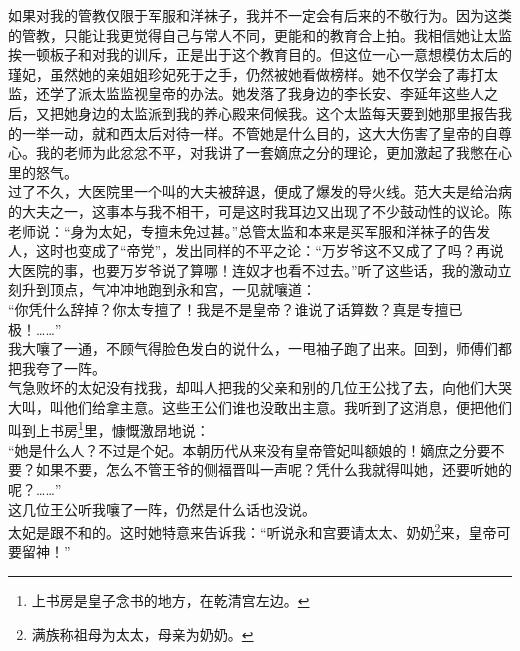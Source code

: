 如果对我的管教仅限于军服和洋袜子，我并不一定会有后来的不敬行为。因为这类的管教，只能让我更觉得自己与常人不同，更能和的教育合上拍。我相信她让太监挨一顿板子和对我的训斥，正是出于这个教育目的。但这位一心一意想模仿太后的瑾妃，虽然她的亲姐姐珍妃死于之手，仍然被她看做榜样。她不仅学会了毒打太监，还学了派太监监视皇帝的办法。她发落了我身边的李长安、李延年这些人之后，又把她身边的太监派到我的养心殿来伺候我。这个太监每天要到她那里报告我的一举一动，就和西太后对待一样。不管她是什么目的，这大大伤害了皇帝的自尊心。我的老师为此忿忿不平，对我讲了一套嫡庶之分的理论，更加激起了我憋在心里的怒气。\\

过了不久，大医院里一个叫的大夫被辞退，便成了爆发的导火线。范大夫是给治病的大夫之一，这事本与我不相干，可是这时我耳边又出现了不少鼓动性的议论。陈老师说：“身为太妃，专擅未免过甚。”总管太监和本来是买军服和洋袜子的告发人，这时也变成了“帝党”，发出同样的不平之论：“万岁爷这不又成了了吗？再说大医院的事，也要万岁爷说了算哪！连奴才也看不过去。”听了这些话，我的激动立刻升到顶点，气冲冲地跑到永和宫，一见就嚷道：\\

“你凭什么辞掉？你太专擅了！我是不是皇帝？谁说了话算数？真是专擅已极！……”\\

我大嚷了一通，不顾气得脸色发白的说什么，一甩袖子跑了出来。回到，师傅们都把我夸了一阵。\\

气急败坏的太妃没有找我，却叫人把我的父亲和别的几位王公找了去，向他们大哭大叫，叫他们给拿主意。这些王公们谁也没敢出主意。我听到了这消息，便把他们叫到上书房\footnote{上书房是皇子念书的地方，在乾清宫左边。}里，慷慨激昂地说：\\

“她是什么人？不过是个妃。本朝历代从来没有皇帝管妃叫额娘的！嫡庶之分要不要？如果不要，怎么不管王爷的侧福晋叫一声呢？凭什么我就得叫她，还要听她的呢？……”\\

这几位王公听我嚷了一阵，仍然是什么话也没说。\\

太妃是跟不和的。这时她特意来告诉我：“听说永和宫要请太太、奶奶\footnote{满族称祖母为太太，母亲为奶奶。}来，皇帝可要留神！”\\

